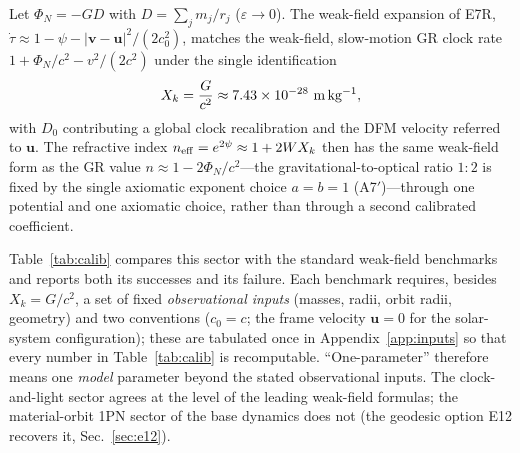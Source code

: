 \documentclass[aps,reprint,amsmath,amssymb,nofootinbib,superscriptaddress,floatfix]{revtex4-2}
\newcommand{\vect}[1]{\bm{#1}}
\newcommand{\Kt}{X_k}
\newcommand{\Dz}{D_0}
\begin{document}
Let $\Phi_N = -G D$ with $D = \sum_j m_j/r_j$ ($\varepsilon\to0$).
The weak-field expansion of E7R,
$\dot\tau \approx 1 - \psi - |\vect{v}-\vect{u}|^2/(2c_0^2)$,
matches the weak-field, slow-motion GR clock rate
$1 + \Phi_N/c^2 - v^2/(2c^2)$ under the single identification
\begin{equation}
\Kt = \frac{G}{c^2} \approx 7.43\times10^{-28}\ {\rm m\,kg^{-1}},
\label{eq:kappa}
\end{equation}
with $\Dz$ contributing a global clock recalibration and the DFM
velocity referred to $\vect{u}$.
The refractive index $n_{\rm eff} = e^{2\psi} \approx 1 + 2W\Kt$ then
has the same weak-field form as the GR value
$n \approx 1 - 2\Phi_N/c^2$---the gravitational-to-optical ratio
$1{:}2$ is fixed by the single axiomatic exponent choice $a = b = 1$
(A7$'$)---through one potential and one axiomatic choice, rather than
through a second calibrated coefficient.

Table~\ref{tab:calib} compares this sector with the standard
weak-field benchmarks and reports both its successes and its failure.
Each benchmark requires, besides $\Kt = G/c^2$, a set of fixed
\emph{observational inputs} (masses, radii, orbit radii, geometry) and
two conventions ($c_0 = c$; the frame velocity $\vect{u} = 0$ for the
solar-system configuration); these are tabulated once in
Appendix~\ref{app:inputs} so that every number in
Table~\ref{tab:calib} is recomputable.
``One-parameter'' therefore means one \emph{model} parameter beyond
the stated observational inputs.
The clock-and-light sector agrees at the level of the leading
weak-field formulas; the material-orbit 1PN sector of the base
dynamics does not (the geodesic option E12 recovers it,
Sec.~\ref{sec:e12}).
\end{document}
